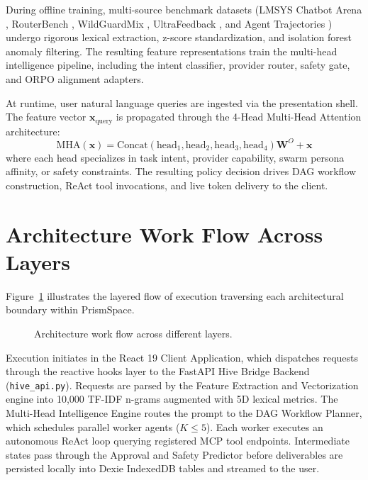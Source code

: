 \documentclass[12pt,a4paper]{report}
\begin{document}
During offline training, multi-source benchmark datasets (LMSYS Chatbot Arena \cite{ref_lmsys}, RouterBench \cite{ref_routerbench}, WildGuardMix \cite{ref_wildguard}, UltraFeedback \cite{ref_ultrafeedback}, and Agent Trajectories \cite{ref_agent_trajectories}) undergo rigorous lexical extraction, z-score standardization, and isolation forest anomaly filtering. The resulting feature representations train the multi-head intelligence pipeline, including the intent classifier, provider router, safety gate, and ORPO alignment adapters.

At runtime, user natural language queries are ingested via the presentation shell. The feature vector $\mathbf{x}_{\text{query}}$ is propagated through the 4-Head Multi-Head Attention architecture:
\begin{equation}
    \mathrm{MHA}(\mathbf{x}) = \mathrm{Concat}(\mathrm{head}_1, \mathrm{head}_2, \mathrm{head}_3, \mathrm{head}_4)\mathbf{W}^O + \mathbf{x}
\end{equation}
where each head specializes in task intent, provider capability, swarm persona affinity, or safety constraints. The resulting policy decision drives DAG workflow construction, ReAct tool invocations, and live token delivery to the client.

\section{Architecture Work Flow Across Layers}
Figure~\ref{fig:arch_workflow} illustrates the layered flow of execution traversing each architectural boundary within PrismSpace.

\begin{figure}[H]
    \centering
    \caption{Architecture work flow across different layers.}
    \label{fig:arch_workflow}
\end{figure}

Execution initiates in the React 19 Client Application, which dispatches requests through the reactive hooks layer to the FastAPI Hive Bridge Backend (\texttt{hive\_api.py}). Requests are parsed by the Feature Extraction and Vectorization engine into 10,000 TF-IDF n-grams augmented with 5D lexical metrics. The Multi-Head Intelligence Engine routes the prompt to the DAG Workflow Planner, which schedules parallel worker agents ($K \le 5$). Each worker executes an autonomous ReAct loop querying registered MCP tool endpoints. Intermediate states pass through the Approval and Safety Predictor before deliverables are persisted locally into Dexie IndexedDB tables and streamed to the user.
\end{document}
